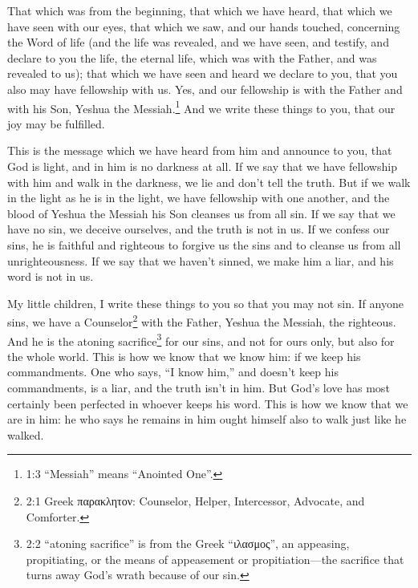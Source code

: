 




\vspace{-1.36in}


\mychapter{} \myverse*{}That which was from the beginning, that which we have heard, that which we have seen with our eyes, that which we saw, and our hands touched, concerning the Word of life \myverse{}(and the life was revealed, and we have seen, and testify, and declare to you the life, the eternal life, which was with the Father, and was revealed to us); \myverse{}that which we have seen and heard we declare to you, that you also may have fellowship with us. Yes, and our fellowship is with the Father and with his Son, Yeshua the Messiah.\footnote{ 1:3 “Messiah” means “Anointed One”.} \myverse{}And we write these things to you, that our joy may be fulfilled.


\myverse{}This is the message which we have heard from him and announce to you, that God is light, and in him is no darkness at all. \myverse{}If we say that we have fellowship with him and walk in the darkness, we lie and don’t tell the truth. \myverse{}But if we walk in the light as he is in the light, we have fellowship with one another, and the blood of Yeshua the Messiah his Son cleanses us from all sin. \myverse{}If we say that we have no sin, we deceive ourselves, and the truth is not in us. \myverse{}If we confess our sins, he is faithful and righteous to forgive us the sins and to cleanse us from all unrighteousness. \myverse{}If we say that we haven’t sinned, we make him a liar, and his word is not in us.


\mychapter{} \myverse*{}My little children, I write these things to you so that you may
not sin. If anyone sins, we have a Counselor\footnote{ 2:1 Greek παρακλητον: Counselor, Helper, Intercessor, Advocate, and Comforter.} with the
Father, Yeshua the Messiah, the righteous. \myverse{}And he is the atoning sacrifice\footnote{ 2:2 “atoning sacrifice” is from the Greek “ιλασμος”, an appeasing, propitiating, or the means of appeasement or propitiation—the sacrifice that turns away God’s wrath because of our sin.} for our sins, and not for ours only, but also for the whole world. \myverse{}This is how we know that we know him: if we keep his commandments. \myverse{}One who says, “I know him,” and doesn’t keep his commandments, is a liar, and the truth isn’t in him. \myverse{}But God’s love has most certainly been perfected in whoever keeps his word. This is how we know that we are in him: \myverse{}he who says he remains in him ought himself also to walk just like he walked.


